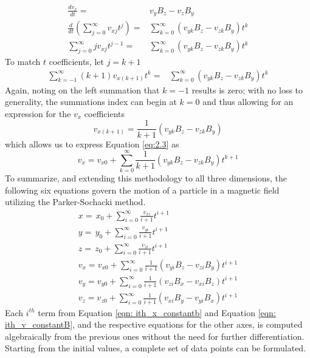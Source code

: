 \documentclass{article}
\begin{document}
    \begin{equation}
        \begin{split}
        \frac{dv_x}{dt}=&v_yB_z-v_zB_y\\
        \frac{d}{dt}\left(\sum_{j=0}^\infty v_{xj}t^j\right)=&\sum_{k=0}^\infty (v_{yk}B_z-v_{zk}B_y)t^k\\  
        \sum_{j=0}^\infty jv_{xj}t^{j-1}=&\sum_{k=0}^\infty (v_{yk}B_z-v_{zk}B_y)t^k  
        \end{split}
    \end{equation}
To match $t$ coefficients, let $j=k+1$ 
    \begin{equation}
        \begin{split}  
        \sum_{k=-1}^\infty (k+1)v_{x(k+1)}t^{k}=&\sum_{k=0}^\infty (v_{yk}B_z-v_{zk}B_y)t^k  
        \end{split}
    \end{equation}
Again, noting on the left summation that $k=-1$ results is zero; with no loss to generality, the summations index can begin at $k=0$ and thus allowing for an expression for the $v_x$ coefficients
    \begin{equation}\label{eqn: ith_v_constantB}
        v_{x(k+1)}=\frac{1}{k+1} (v_{yk}B_z-v_{zk}B_y) 
    \end{equation}
which allows us to express Equation \ref{eq:2.3} as
    \begin{equation}
            {v_x=v_{x0}+\sum_{k=0}^\infty\frac{1}{k+1} (v_{yk}B_z-v_{zk}B_y)t^{k+1}}
    \end{equation}
To summarize, and extending this methodology to all three dimensions, the following six equations govern the motion of a particle in a magnetic field utilizing the Parker-Sochacki method.
    \begin{gather}
        x=\,x_0 + \sum_{i=0}^\infty\frac{v_{xi}}{i+1} t^{i+1}\\
        y=\,y_0 + \sum_{i=0}^\infty\frac{v_{yi}}{i+1} t^{i+1}\\
        z=\,z_0 + \sum_{i=0}^\infty\frac{v_{zi}}{i+1} t^{i+1}\\
        v_x=v_{x0}+\sum_{i=0}^\infty\frac{1}{i+1} (v_{yi}B_z-v_{zi}B_y)t^{i+1}\\
        v_y=v_{y0}+\sum_{i=0}^\infty\frac{1}{i+1} (v_{zi}B_x-v_{xi}B_z)t^{i+1}\\
        v_z=v_{z0}+\sum_{i=0}^\infty\frac{1}{i+1} (v_{xi}B_y-v_{yi}B_x)t^{i+1}
    \end{gather}
Each $i^{th}$ term from Equation \ref{eqn: ith_x_constantb} and Equation \ref{eqn: ith_v_constantB}, and the respective equations for the other axes, is computed algebraically from the previous ones without the need for further differentiation. Starting from the initial values, a complete set of data points can be formulated.\\
\end{document}
